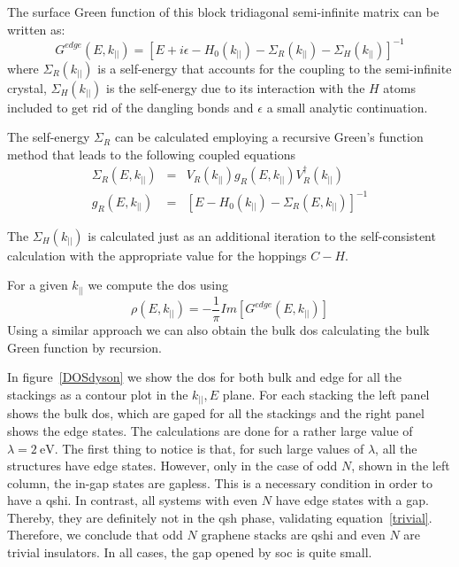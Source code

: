 The surface Green function of this  block tridiagonal semi-infinite matrix can be  written as:
\begin{equation}
G^{edge}(E,k_{||}) =
\left[E+i\epsilon-H_0(k_{||})-\Sigma_{R}(k_{||})-\Sigma_{H}(k_{||})\right]^{-1}
\end{equation}
where $\Sigma_{R}(k_{||})$ is a self-energy that accounts for the coupling to the semi-infinite crystal,
$\Sigma_{H}(k_{||})$ is the self-energy due to its interaction with the $H$ atoms included to get rid of the dangling bonds and $\epsilon$ a small analytic continuation.

The self-energy $\Sigma_{R}$ can be calculated employing a recursive Green's function method that leads to the following coupled equations
\begin{eqnarray}
\nonumber \Sigma_{R}(E,k_{||})&=& V_{R}(k_{||})g_{R}(E,k_{||})V^{\dagger}_{R}(k_{||})
\\
g_{R}(E,k_{||}) &=& \left[E-H_0(k_{||}) -\Sigma_{R}(E,k_{||})\right]^{-1}
\end{eqnarray}

The $\Sigma_{H}(k_{||})$ is calculated just as an additional iteration to the self-consistent calculation with the appropriate value for the hoppings $C-H$.

For a given $k_{||}$ we compute the \ac{dos} using
\begin{equation}
 \rho(E,k_{||}) = -\frac{1}{\pi} Im[G^{edge}(E,k_{||})]
\end{equation}
Using a similar  approach we can also obtain the bulk \ac{dos}  calculating the bulk Green function by recursion.

In figure~\ref{DOSdyson} we show the \ac{dos} for both bulk and edge for all the stackings as a contour plot in the $k_{||},E$ plane. For each stacking the left panel shows the bulk \ac{dos}, which are gaped for all the stackings and the right panel shows the edge states.  The calculations are done for a rather large value of $\lambda=\SI{2}{\eV}$. The first thing to  notice is that, for such large values of $\lambda$, all the structures have edge states. However, only in the case of odd $N$, shown in the left column, the in-gap states are gapless.  This is a necessary condition in order to have a \ac{qshi}.  In contrast,  all systems with even $N$ have edge states with a gap. Thereby, they are definitely not in the \ac{qsh} phase, validating
 equation~\eqref{trivial}. Therefore, we conclude that odd  $N$ graphene stacks are \ac{qshi} and even $N$ are trivial insulators. In all cases, the gap opened by \ac{soc} is quite small.



